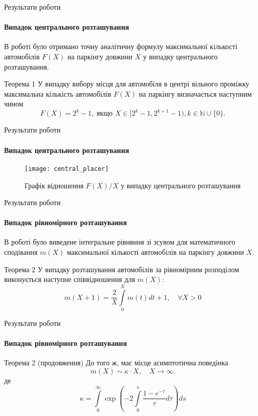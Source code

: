 \begin{frame}{Результати роботи}
	\framesubtitle{Випадок центрального розташування}
	\manimate
	В роботі було отримано точну аналітичну формулу максимальної кількості автомобілів $F(X)$ на паркінгу довжини $X$ у випадку центрального розташування.
	\begin{block}{Теорема 1}
		У випадку вибору місця для автомобіля в центрі вільного проміжку максимальна кількість автомобілів $F(X)$ на паркінгу визначається наступним чином
		\[
			F(X) = 2^k - 1,\; \text{якщо } X \in [2^k - 1, 2^{k+1} - 1), k \in \mathbb{N} \cup \{0\}.
		\]
	\end{block}
\end{frame}

\begin{frame}{Результати роботи}
	\framesubtitle{Випадок центрального розташування}
	\manimate
	\vspace{-10pt}
	\begin{figure}
		\centering
		\texttt{[image: central\_placer]}
		\caption{\centering Графік відношення $F(X)/X$ у випадку центрального розташування}
	\end{figure}

	
\end{frame}
\begin{frame}{Результати роботи}
	\framesubtitle{Випадок рівномірного розташування}
	\manimate
	В роботі було виведене інтегральне рівняння зі зсувом для математичного сподівання $m(X)$ максимальної кількості автомобілів на паркінгу довжини $X$.
	\begin{block}{Теорема 2}
	У випадку розташування автомобілів за рівномірним розподілом виконується наступне співвідношення для $m(X)$:
        \[
            	m(X + 1) = \frac{2}{X} \int\limits_0^{X} m(t) dt + 1,\quad \forall X > 0
        \]
	\end{block}
\end{frame}

\begin{frame}{Результати роботи}
	\framesubtitle{Випадок рівномірного розташування}
	\manimate
	\begin{block}{Теорема 2 (продовження)}
		До того ж, має місце асимптотична поведінка
		\[
	m(X) \sim  \kappa  \cdot X, \quad X \rightarrow \infty.
		\]
		де
		\[
			\kappa = \int\limits_0^\infty \exp\left( -2\int\limits_0^s \frac{1 - e^{-\tau}}{\tau} d\tau  \right) ds 
		\]
	\end{block}
\end{frame}

